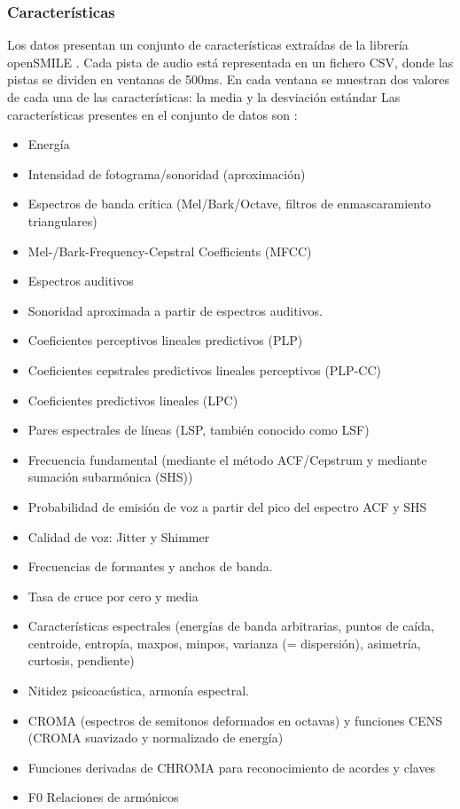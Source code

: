 \documentclass[12pt,a4paper,Spanish]{book}
\begin{document}
\subsubsection{Características}
Los datos presentan un conjunto de características extraídas de la librería openSMILE \cite{openSMILE}. Cada pista de audio está representada en un fichero CSV, donde las pistas se dividen en ventanas de 500ms. En cada ventana se muestran dos valores de cada una de las características: la media y la desviación estándar
Las características presentes en el conjunto de datos son \cite{openSMILEfeatures}:
\begin{itemize}
	\item Energía
	\item Intensidad de fotograma/sonoridad (aproximación)
	\item Espectros de banda crítica (Mel/Bark/Octave, filtros de enmascaramiento triangulares)
	\item Mel-/Bark-Frequency-Cepstral Coefficients (MFCC)
	\item Espectros auditivos
	\item Sonoridad aproximada a partir de espectros auditivos.
	\item Coeficientes perceptivos lineales predictivos (PLP)
	\item Coeficientes cepstrales predictivos lineales perceptivos (PLP-CC)
	\item Coeficientes predictivos lineales (LPC)
	\item Pares espectrales de líneas (LSP, también conocido como LSF)
	\item Frecuencia fundamental (mediante el método ACF/Cepstrum y mediante sumación subarmónica (SHS))
	\item Probabilidad de emisión de voz a partir del pico del espectro ACF y SHS
	\item Calidad de voz: Jitter y Shimmer
	\item Frecuencias de formantes y anchos de banda.
	\item Tasa de cruce por cero y media
	\item Características espectrales (energías de banda arbitrarias, puntos de caída, centroide, entropía, maxpos, minpos, varianza (= dispersión), asimetría, curtosis, pendiente)
	\item Nitidez psicoacústica, armonía espectral.
	\item  CROMA (espectros de semitonos deformados en octavas) y funciones CENS (CROMA suavizado y normalizado de energía)
	\item Funciones derivadas de CHROMA para reconocimiento de acordes y claves
	\item F0 Relaciones de armónicos
\end{itemize}
\end{document}
